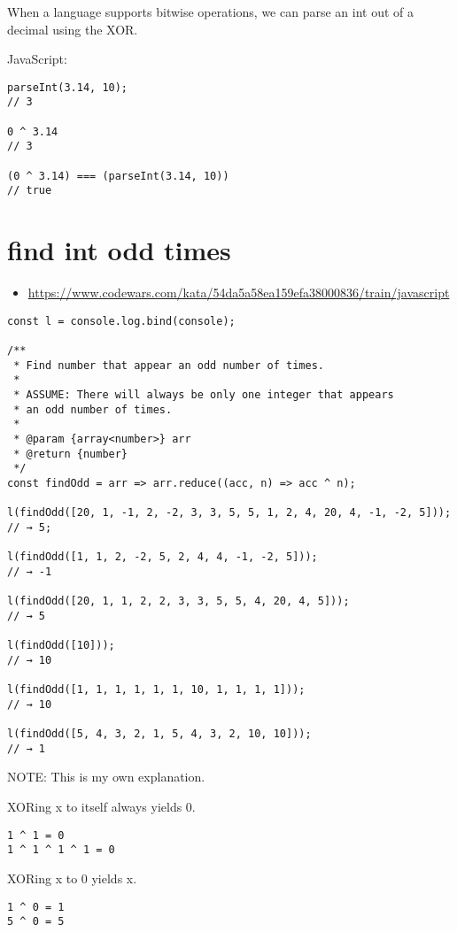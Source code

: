 \documentclass[11pt]{article}
\begin{document}
When a language supports bitwise operations, we can parse an int out of a decimal using the XOR.

JavaScript:

\begin{verbatim}
parseInt(3.14, 10);
// 3

0 ^ 3.14
// 3

(0 ^ 3.14) === (parseInt(3.14, 10))
// true
\end{verbatim}



\section{find int odd times}
\label{sec:orge3b5c35}

\begin{itemize}
\item \url{https://www.codewars.com/kata/54da5a58ea159efa38000836/train/javascript}
\end{itemize}

\begin{verbatim}
const l = console.log.bind(console);

/**
 * Find number that appear an odd number of times.
 *
 * ASSUME: There will always be only one integer that appears
 * an odd number of times.
 *
 * @param {array<number>} arr
 * @return {number}
 */
const findOdd = arr => arr.reduce((acc, n) => acc ^ n);

l(findOdd([20, 1, -1, 2, -2, 3, 3, 5, 5, 1, 2, 4, 20, 4, -1, -2, 5]));
// → 5;

l(findOdd([1, 1, 2, -2, 5, 2, 4, 4, -1, -2, 5]));
// → -1

l(findOdd([20, 1, 1, 2, 2, 3, 3, 5, 5, 4, 20, 4, 5]));
// → 5

l(findOdd([10]));
// → 10

l(findOdd([1, 1, 1, 1, 1, 1, 10, 1, 1, 1, 1]));
// → 10

l(findOdd([5, 4, 3, 2, 1, 5, 4, 3, 2, 10, 10]));
// → 1
\end{verbatim}


NOTE: This is my own explanation.

XORing x to itself always yields 0.
\begin{verbatim}
1 ^ 1 = 0
1 ^ 1 ^ 1 ^ 1 = 0
\end{verbatim}


XORing x to 0 yields x.
\begin{verbatim}
1 ^ 0 = 1
5 ^ 0 = 5
\end{verbatim}
\end{document}
